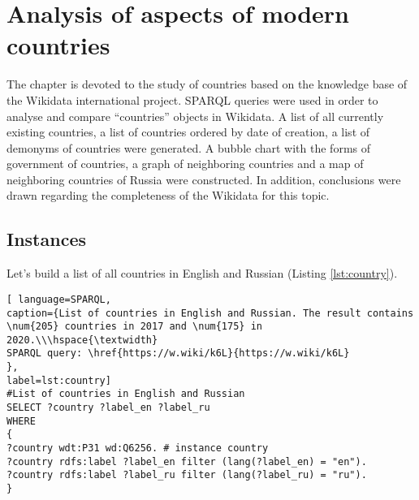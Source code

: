 \setchapterpreamble[u]{\margintoc}
\chapter{Analysis of aspects of modern countries\protect\footnotemark}


The chapter is devoted to the study of countries based on the knowledge base of the Wikidata international project. SPARQL queries were used in order to analyse and compare ``countries'' objects in Wikidata. A list of all currently existing countries, a list of countries ordered by date of creation, a list of demonyms of countries were generated. A bubble chart with the forms of government of countries, a graph of neighboring countries and a map of neighboring countries of Russia were constructed. In addition, conclusions were drawn regarding the completeness of the Wikidata for this topic.

\section{Instances}

Let's build a list of all countries in English and Russian (Listing \ref{lst:country}).

\begin{lstlisting}[ language=SPARQL, 
caption={List of countries in English and Russian. The result contains \num{205} countries in 2017 and \num{175} in 2020.\\\hspace{\textwidth}
SPARQL query: \href{https://w.wiki/k6L}{https://w.wiki/k6L}
},
label=lst:country]
#List of countries in English and Russian
SELECT ?country ?label_en ?label_ru
WHERE
{
?country wdt:P31 wd:Q6256. # instance country
?country rdfs:label ?label_en filter (lang(?label_en) = "en").
?country rdfs:label ?label_ru filter (lang(?label_ru) = "ru").
}
\end{lstlisting}


\begin{marginfigure}[0.0cm]
	{
		\setlength{\fboxsep}{0pt}%
		\setlength{\fboxrule}{1pt}%
	}
    \caption[Number of properties of instances of the Wikidata object Country.]{%
		High degree of filling according to the number of properties of the Wikidata object \href{https://www.wikidata.org/wiki/Q6256}{Country (Q6256)}.  
		Data obtained using the service \href{https://prowd.id/dashboards/86b6f91a8131/profile}{ProWD.id}, 2020. \emph{The Gini coefficient is 0.091.}
	}%
	\label{fig:ProWD_country}%
\end{marginfigure}

